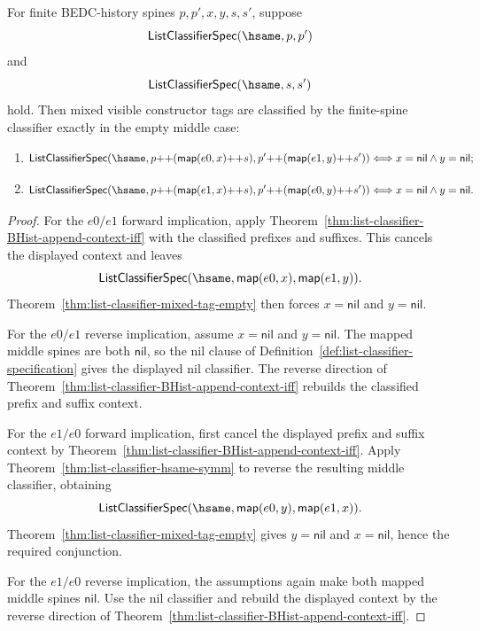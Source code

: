 \begin{theorem}
\label{thm:list-classifier-mixed-tag-append-context-exactness}
For finite BEDC-history spines $p,p',x,y,s,s'$, suppose
$$
\mathsf{ListClassifierSpec}(\hsame,p,p')
$$
and
$$
\mathsf{ListClassifierSpec}(\hsame,s,s')
$$
hold. Then mixed visible constructor tags are classified by the finite-spine
classifier exactly in the empty middle case:
\begin{enumerate}
  \item
  $$
  \mathsf{ListClassifierSpec}(\hsame,
    p{++}(\mathsf{map}(e0,x){++}s),
    p'{++}(\mathsf{map}(e1,y){++}s'))
  \Longleftrightarrow
  x=\mathsf{nil}\land y=\mathsf{nil};
  $$
  \item
  $$
  \mathsf{ListClassifierSpec}(\hsame,
    p{++}(\mathsf{map}(e1,x){++}s),
    p'{++}(\mathsf{map}(e0,y){++}s'))
  \Longleftrightarrow
  x=\mathsf{nil}\land y=\mathsf{nil}.
  $$
\end{enumerate}
\end{theorem}
\begin{proof}
For the $e0/e1$ forward implication, apply
Theorem~\ref{thm:list-classifier-BHist-append-context-iff} with the classified
prefixes and suffixes. This cancels the displayed context and leaves
$$
\mathsf{ListClassifierSpec}(\hsame,\mathsf{map}(e0,x),\mathsf{map}(e1,y)).
$$
Theorem~\ref{thm:list-classifier-mixed-tag-empty} then forces
$x=\mathsf{nil}$ and $y=\mathsf{nil}$.

For the $e0/e1$ reverse implication, assume
$x=\mathsf{nil}$ and $y=\mathsf{nil}$. The mapped middle spines are both
$\mathsf{nil}$, so the nil clause of
Definition~\ref{def:list-classifier-specification} gives the displayed nil
classifier. The reverse direction of
Theorem~\ref{thm:list-classifier-BHist-append-context-iff} rebuilds the
classified prefix and suffix context.

For the $e1/e0$ forward implication, first cancel the displayed prefix and
suffix context by Theorem~\ref{thm:list-classifier-BHist-append-context-iff}.
Apply Theorem~\ref{thm:list-classifier-hsame-symm} to reverse the resulting
middle classifier, obtaining
$$
\mathsf{ListClassifierSpec}(\hsame,\mathsf{map}(e0,y),\mathsf{map}(e1,x)).
$$
Theorem~\ref{thm:list-classifier-mixed-tag-empty} gives
$y=\mathsf{nil}$ and $x=\mathsf{nil}$, hence the required conjunction.

For the $e1/e0$ reverse implication, the assumptions again make both mapped
middle spines $\mathsf{nil}$. Use the nil classifier and rebuild the displayed
context by the reverse direction of
Theorem~\ref{thm:list-classifier-BHist-append-context-iff}.
\end{proof}

